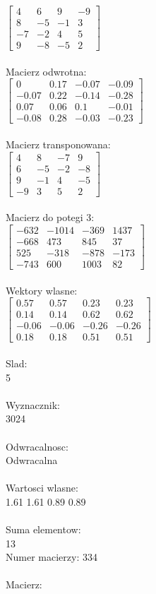 \documentclass[a4paper,12pt]{article}
\begin{document}
$\begin{bmatrix} 4&6&9&-9\\8&-5&-1&3\\-7&-2&4&5\\9&-8&-5&2 \end{bmatrix}$
\\
\\
Macierz odwrotna:\\

$\begin{bmatrix} 0&0.17&-0.07&-0.09\\-0.07&0.22&-0.14&-0.28\\0.07&0.06&0.1&-0.01\\-0.08&0.28&-0.03&-0.23 \end{bmatrix}$
\\
\\
Macierz transponowana:\\

$\begin{bmatrix} 4&8&-7&9\\6&-5&-2&-8\\9&-1&4&-5\\-9&3&5&2 \end{bmatrix}$
\\
\\
Macierz do potegi 3:\\

$\begin{bmatrix} -632&-1014&-369&1437\\-668&473&845&37\\525&-318&-878&-173\\-743&600&1003&82 \end{bmatrix}$
\\
\\
Wektory wlasne:\\

$\begin{bmatrix} 0.57&0.57&0.23&0.23\\0.14&0.14&0.62&0.62\\-0.06&-0.06&-0.26&-0.26\\0.18&0.18&0.51&0.51 \end{bmatrix}$
\\
\\
Slad:\\
5
\\
\\
Wyznacznik:\\
3024
\\
\\
Odwracalnosc:\\
Odwracalna
\\
\\
Wartosci wlasne:\\
1.61 1.61 0.89 0.89
\\
\\
Suma elementow:\\
13
\\
\newpage
Numer macierzy:
334
\\
\\
Macierz:\\
\end{document}
